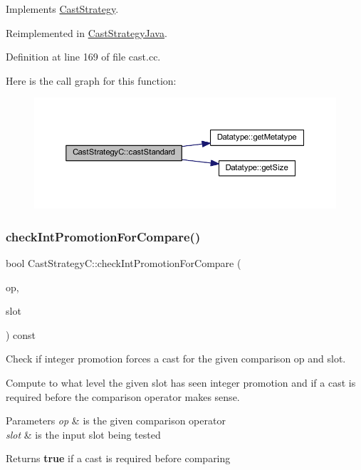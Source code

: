 Implements \mbox{\hyperlink{class_cast_strategy_a9ca9d31afeefca9a43cd8114333bcb21}{Cast\+Strategy}}.



Reimplemented in \mbox{\hyperlink{class_cast_strategy_java_a6a9d4ec935035f52d214326cb6e0a33f}{Cast\+Strategy\+Java}}.



Definition at line 169 of file cast.\+cc.

Here is the call graph for this function\+:
\nopagebreak
\begin{figure}[H]
\begin{center}
\leavevmode
\includegraphics[width=350pt]{class_cast_strategy_c_a057c06b312662b80be294439465be4ff_cgraph}
\end{center}
\end{figure}
\mbox{\label{class_cast_strategy_c_a6d9b4790d67649bc3dcd760052de381a}} 
\subsubsection{\texorpdfstring{checkIntPromotionForCompare()}{checkIntPromotionForCompare()}}
{\footnotesize\ttfamily bool Cast\+Strategy\+C\+::check\+Int\+Promotion\+For\+Compare (\begin{DoxyParamCaption}\item[{const \mbox{\hyperlink{class_pcode_op}{Pcode\+Op}} $\ast$}]{op,  }\item[{int4}]{slot }\end{DoxyParamCaption}) const\hspace{0.3cm}{\ttfamily [virtual]}}



Check if integer promotion forces a cast for the given comparison op and slot. 

Compute to what level the given slot has seen integer promotion and if a cast is required before the comparison operator makes sense. 
\begin{DoxyParams}{Parameters}
{\em op} & is the given comparison operator \\
\hline
{\em slot} & is the input slot being tested \\
\hline
\end{DoxyParams}
\begin{DoxyReturn}{Returns}
{\bfseries{true}} if a cast is required before comparing 
\end{DoxyReturn}



